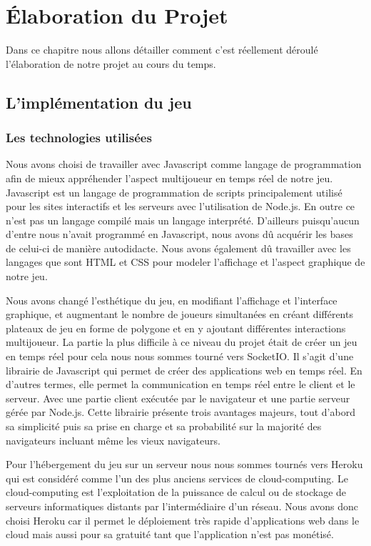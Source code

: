 \chapter{Élaboration du Projet}
\label{sec:unchapitre}

Dans ce chapitre nous allons détailler comment c'est réellement déroulé l'élaboration de notre projet au cours du temps.

\section{L'implémentation du jeu}

\subsection{Les technologies utilisées}

Nous avons choisi de travailler avec Javascript comme langage de programmation afin de mieux appréhender l'aspect multijoueur en temps réel de notre jeu. Javascript est un langage de programmation de scripts principalement utilisé pour les sites interactifs et les serveurs avec l'utilisation de Node.js. En outre ce n'est pas un langage compilé mais un langage interprété. D'ailleurs puisqu'aucun d'entre nous n'avait programmé en Javascript, nous avons dû acquérir les bases de celui-ci de manière autodidacte. Nous avons également dû travailler avec les langages que sont HTML et CSS pour modeler l'affichage et l'aspect graphique de notre jeu.

Nous avons changé l'esthétique du jeu, en modifiant l'affichage et l'interface graphique, et augmentant le nombre de joueurs simultanées en créant différents plateaux de jeu en forme de polygone et en y ajoutant différentes interactions multijoueur. La partie la plus difficile à ce niveau du projet était de créer un jeu en temps réel pour cela nous nous sommes tourné vers SocketIO. Il s'agit d'une librairie de Javascript qui permet de créer des applications web en temps réel. En d'autres termes, elle permet la communication en temps réel entre le client et le serveur. Avec une partie client exécutée par le navigateur et une partie serveur gérée par Node.js. Cette librairie présente trois avantages majeurs, tout d'abord sa simplicité puis sa prise en charge et sa probabilité sur la majorité des navigateurs incluant même les vieux navigateurs.


Pour l'hébergement du jeu sur un serveur nous nous sommes tournés vers Heroku qui est considéré comme l'un des plus anciens services de cloud-computing. Le cloud-computing est l'exploitation de la puissance de calcul ou de stockage de serveurs informatiques distants par l'intermédiaire d'un réseau. Nous avons donc choisi Heroku car il permet le déploiement très rapide d'applications web dans le cloud mais aussi pour sa gratuité tant que l'application n'est pas monétisé.


